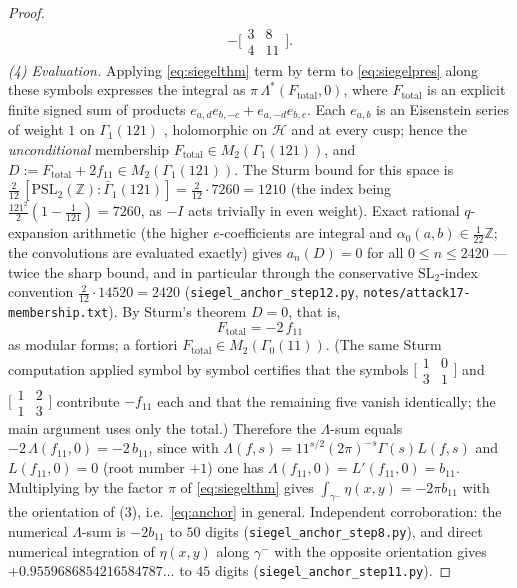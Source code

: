 \documentclass[preprint,12pt]{elsarticle}
\theoremstyle{definition}
\theoremstyle{remark}
\newcommand{\Z}{\mathbb{Z}}
\begin{document}
\begin{proof}
\[\begin{aligned}
   -\bigl[\begin{smallmatrix}3&8\\4&11\end{smallmatrix}\bigr].
\end{aligned}
\]
\emph{(4) Evaluation.}  Applying \eqref{eq:siegelthm} term by term to
\eqref{eq:siegelpres} along these symbols expresses the integral as
$\pi\,\Lambda^*(F_{\mathrm{total}},0)$, where $F_{\mathrm{total}}$ is an
explicit finite signed sum of products
$e_{a,d}e_{b,-c}+e_{a,-d}e_{b,c}$.  Each $e_{a,b}$ is an Eisenstein
series of weight $1$ on $\Gamma_1(121)$
\cite[Definition~10 and Lemma~11]{BrunaultSiegel}, holomorphic on
$\mathcal{H}$ and at every cusp; hence the \emph{unconditional}
membership $F_{\mathrm{total}}\in M_2(\Gamma_1(121))$, and
$D:=F_{\mathrm{total}}+2f_{11}\in M_2(\Gamma_1(121))$.  The Sturm bound
for this space is
$\frac{2}{12}\,[\mathrm{PSL}_2(\Z):\bar\Gamma_1(121)]
 =\frac{2}{12}\cdot 7260=1210$ (the index being
$\frac{121^2}{2}(1-\frac1{121})=7260$, as $-I$ acts trivially in even
weight).  Exact rational $q$-expansion arithmetic (the higher
$e$-coefficients are integral and
$\alpha_0(a,b)\in\frac1{22}\Z$; the convolutions are evaluated exactly)
gives $a_n(D)=0$ for all $0\le n\le 2420$ --- twice the sharp bound, and
in particular through the conservative $\mathrm{SL}_2$-index convention
$\frac{2}{12}\cdot14520=2420$ (\texttt{siegel\_anchor\_step12.py},
\texttt{notes/attack17-membership.txt}).  By Sturm's theorem $D=0$,
that is,
\[
  F_{\mathrm{total}}=-2\,f_{11}
\]
as modular forms; a fortiori $F_{\mathrm{total}}\in M_2(\Gamma_0(11))$.
(The same Sturm computation applied symbol by symbol certifies that the
symbols $\bigl[\begin{smallmatrix}1&0\\3&1\end{smallmatrix}\bigr]$ and
$\bigl[\begin{smallmatrix}1&2\\1&3\end{smallmatrix}\bigr]$ contribute
$-f_{11}$ each and that the remaining five vanish identically; the main
argument uses only the total.)  Therefore the
$\Lambda$-sum equals $-2\,\Lambda(f_{11},0)=-2\,b_{11}$, since with
$\Lambda(f,s)=11^{s/2}(2\pi)^{-s}\Gamma(s)L(f,s)$ and $L(f_{11},0)=0$
(root number $+1$) one has $\Lambda(f_{11},0)=L'(f_{11},0)=b_{11}$.
Multiplying by the factor $\pi$ of \eqref{eq:siegelthm} gives
$\int_{\gamma^-}\eta(x,y)=-2\pi b_{11}$ with the orientation of (3),
i.e.\ \eqref{eq:anchor} in general.  Independent corroboration: the
numerical $\Lambda$-sum is $-2b_{11}$ to $50$ digits
(\texttt{siegel\_anchor\_step8.py}), and direct numerical integration of
$\eta(x,y)$ along $\gamma^-$ with the opposite orientation gives
$+0.9559686854216584787\ldots$ to $45$ digits
(\texttt{siegel\_anchor\_step11.py}).
\end{proof}
\end{document}
